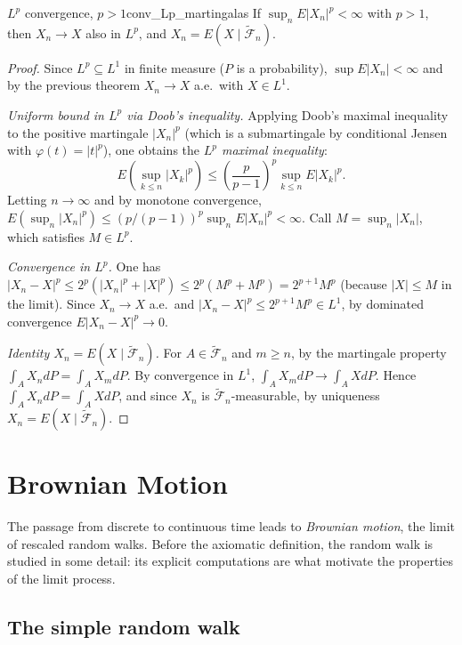 \documentclass[11pt, a4paper]{article}
\begin{document}
\begin{teorema}{$L^p$ convergence, $p > 1$}{conv_Lp_martingalas}
If $\sup_n E|X_n|^p < \infty$ with $p > 1$, then $X_n \to X$ also in $L^p$, and
$X_n = E(X \mid \widetilde{\mathcal{F}}_n)$.
\end{teorema}

\begin{proof}
Since $L^p \subseteq L^1$ in finite measure ($P$ is a probability), $\sup E|X_n| < \infty$ and by the
previous theorem $X_n \to X$ a.e.\ with $X \in L^1$.

\textit{Uniform bound in $L^p$ via Doob's inequality.} Applying Doob's maximal inequality to
the positive martingale $|X_n|^p$ (which is a submartingale by conditional Jensen with
$\varphi(t) = |t|^p$), one obtains the \emph{$L^p$ maximal inequality}:
$$ E\!\left(\sup_{k \le n} |X_k|^p\right) \le \left(\frac{p}{p - 1}\right)^p \sup_{k \le n}
E|X_k|^p. $$
Letting $n \to \infty$ and by monotone convergence, $E(\sup_n |X_n|^p) \le (p/(p-1))^p \sup_n
E|X_n|^p < \infty$. Call $M = \sup_n |X_n|$, which satisfies $M \in L^p$.

\textit{Convergence in $L^p$.} One has $|X_n - X|^p \le 2^p (|X_n|^p + |X|^p) \le 2^p (M^p + M^p)
= 2^{p+1} M^p$ (because $|X| \le M$ in the limit). Since $X_n \to X$ a.e.\ and $|X_n - X|^p \le
2^{p+1} M^p \in L^1$, by dominated convergence $E|X_n - X|^p \to 0$.

\textit{Identity $X_n = E(X \mid \widetilde{\mathcal{F}}_n)$.} For $A \in
\widetilde{\mathcal{F}}_n$ and $m \ge n$, by the martingale property $\int_A X_n dP = \int_A X_m
dP$. By convergence in $L^1$, $\int_A X_m dP \to \int_A X dP$. Hence $\int_A X_n dP = \int_A X
dP$, and since $X_n$ is $\widetilde{\mathcal{F}}_n$-measurable, by uniqueness $X_n = E(X \mid
\widetilde{\mathcal{F}}_n)$.
\end{proof}

\newpage

\section{Brownian Motion}

The passage from discrete to continuous time leads to \emph{Brownian motion}, the limit of
rescaled random walks. Before the axiomatic definition, the random walk is studied in
some detail: its explicit computations are what motivate the properties of the limit
process.

\subsection{The simple random walk}
\end{document}
